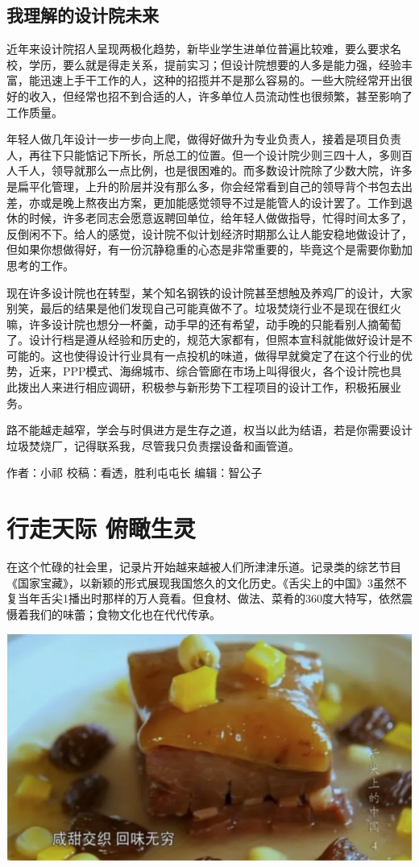 \documentclass[]{book}
\begin{document}
\subsection{我理解的设计院未来}

近年来设计院招人呈现两极化趋势，新毕业学生进单位普遍比较难，要么要求名校，学历，要么就是得走关系，提前实习；但设计院想要的人多是能力强，经验丰富，能迅速上手干工作的人，这种的招揽并不是那么容易的。一些大院经常开出很好的收入，但经常也招不到合适的人，许多单位人员流动性也很频繁，甚至影响了工作质量。

年轻人做几年设计一步一步向上爬，做得好做升为专业负责人，接着是项目负责人，再往下只能惦记下所长，所总工的位置。但一个设计院少则三四十人，多则百人千人，领导就那么一点比例，也是很困难的。而多数设计院除了少数大院，许多是扁平化管理，上升的阶层并没有那么多，你会经常看到自己的领导背个书包去出差，亦或是晚上熬夜出方案，更加能感觉领导不过是能管人的设计罢了。工作到退休的时候，许多老同志会愿意返聘回单位，给年轻人做做指导，忙得时间太多了，反倒闲不下。给人的感觉，设计院不似计划经济时期那么让人能安稳地做设计了，但如果你想做得好，有一份沉静稳重的心态是非常重要的，毕竟这个是需要你勤加思考的工作。

现在许多设计院也在转型，某个知名钢铁的设计院甚至想触及养鸡厂的设计，大家别笑，最后的结果是他们发现自己可能真做不了。垃圾焚烧行业不是现在很红火嘛，许多设计院也想分一杯羹，动手早的还有希望，动手晚的只能看别人摘葡萄了。设计行档是遵从经验和历史的，规范大家都有，但照本宣科就能做好设计是不可能的。这也使得设计行业具有一点投机的味道，做得早就奠定了在这个行业的优势，近来，PPP模式、海绵城市、综合管廊在市场上叫得很火，各个设计院也具此拨出人来进行相应调研，积极参与新形势下工程项目的设计工作，积极拓展业务。

路不能越走越窄，学会与时俱进方是生存之道，权当以此为结语，若是你需要设计垃圾焚烧厂，记得联系我，尽管我只负责摆设备和画管道。

作者：小祁 校稿：看透，胜利屯屯长 编辑：智公子

\section{行走天际 俯瞰生灵}\label{-}

在这个忙碌的社会里，记录片开始越来越被人们所津津乐道。记录类的综艺节目《国家宝藏》，以新颖的形式展现我国悠久的文化历史。《舌尖上的中国》3虽然不复当年舌尖1播出时那样的万人竟看。但食材、做法、菜肴的360度大特写，依然震慑着我们的味蕾；食物文化也在代代传承。

\includegraphics[width=8.33in]{images/xf1}
\end{document}
